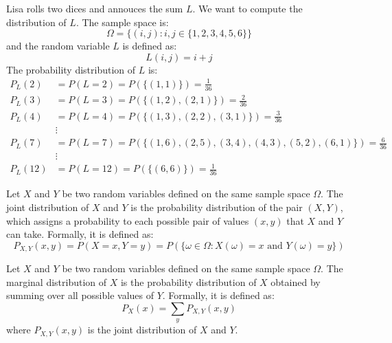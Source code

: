 \begin{eg}
    Lisa rolls two dices and annouces the sum $L$. We want to compute the distribution of $L$. The sample space is:
    \[
        \Omega = \{(i,j) : i,j \in \{1,2,3,4,5,6\}\}
    \]
    and the random variable $L$ is defined as:
    \[
        L(i,j) = i + j
    \]
    The probability distribution of $L$ is:
    \begin{align*}
        P_L(2) &= P(L = 2) = P(\{(1,1)\}) = \frac{1}{36} \\
        P_L(3) &= P(L = 3) = P(\{(1,2), (2,1)\}) = \frac{2}{36} \\
        P_L(4) &= P(L = 4) = P(\{(1,3), (2,2), (3,1)\}) = \frac{3}{36} \\
        &\vdots \\
        P_L(7) &= P(L = 7) = P(\{(1,6), (2,5), (3,4), (4,3), (5,2), (6,1)\}) = \frac{6}{36} \\
        &\vdots \\
        P_L(12) &= P(L = 12) = P(\{(6,6)\}) = \frac{1}{36}
    \end{align*}
\end{eg}

\begin{definition}
    Let $X$ and $Y$ be two random variables defined on the same sample space $\Omega$. The joint distribution of $X$ and $Y$ is the probability distribution of the pair $(X,Y)$, which assigns a probability to each possible pair of values $(x,y)$ that $X$ and $Y$ can take. Formally, it is defined as:
    \[
        P_{X,Y}(x,y) = P(X = x, Y = y) = P(\{\omega \in \Omega : X(\omega) = x \text{ and } Y(\omega) = y\})
    \]
\end{definition}

\begin{definition}
    Let $X$ and $Y$ be two random variables defined on the same sample space $\Omega$. The marginal distribution of $X$ is the probability distribution of $X$ obtained by summing over all possible values of $Y$. Formally, it is defined as:
    \[
        P_X(x) = \sum_{y} P_{X,Y}(x,y)
    \]
    where $P_{X,Y}(x,y)$ is the joint distribution of $X$ and $Y$.
\end{definition}

